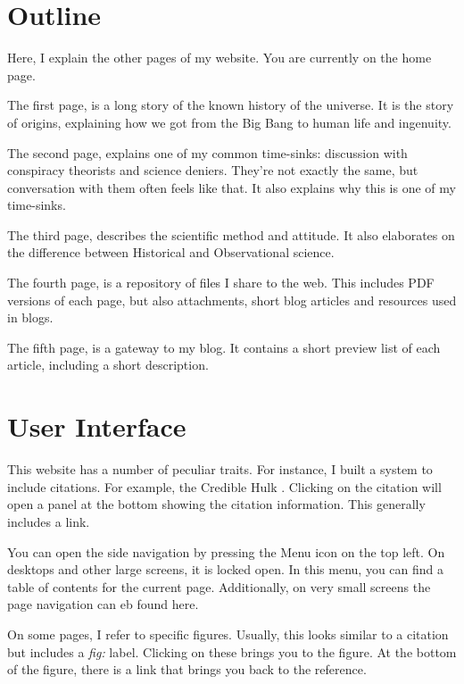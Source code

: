 \begin{multicols}{2}
\section{Outline}  
Here, I explain the other pages of my website. You are currently on the home page.

The first page,  is a long story of the known history of the universe. It is the story of origins, explaining how we got from the Big Bang to human life and ingenuity.

The second page,  explains one of my common time-sinks: discussion with conspiracy theorists and science deniers. They're not exactly the same, but conversation with them often feels like that. It also explains why this is one of my time-sinks.

The third page,  describes the scientific method and attitude. It also elaborates on the difference between Historical and Observational science.

The fourth page,  is a repository of files I share to the web. This includes PDF versions of each page, but also attachments, short blog articles and resources used in blogs. 

The fifth page,  is a gateway to my blog. It contains a short preview list of each article, including a short description. 

\section{User Interface}

This website has a number of peculiar traits. For instance, I built a system to include citations. For example, the Credible Hulk \cite{crediblehulk}. Clicking on the citation will open a panel at the bottom showing the citation information. This generally includes a link.

You can open the side navigation by pressing the Menu icon on the top left. On desktops and other large screens, it is locked open. In this menu, you can find a table of contents for the current page. Additionally, on very small screens the page navigation can eb found here.

On some pages, I refer to specific figures. Usually, this looks similar to a citation but includes a \emph{fig:} label. Clicking on these brings you to the figure. At the bottom of the figure, there is a link that brings you back to the reference.
\end{multicols}
